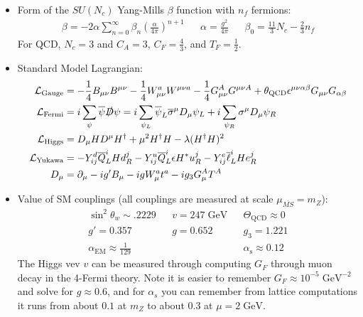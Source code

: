 \documentclass[11pt, oneside]{article}   	%
\theoremstyle{definition}
\numberwithin{equation}{subsection}		%
\begin{document}
\begin{itemize}
	\item Form of the $SU(N_c)$ Yang-Mills $\beta$ function with $n_f$ fermions:
	\begin{align}
		\beta = -2\alpha \sum_{n = 0}^\infty \beta_n \left(\frac{\alpha}{4\pi}\right)^{n + 1} && \alpha = \frac{g^2}{4\pi} &&
		\beta_0 = \frac{11}{3} N_c - \frac{2}{3} n_f 
	\end{align}
	For QCD, $N_c = 3$ and $C_A = 3$, $C_F = \frac{4}{3}$, and $T_F = \frac{1}{2}$.
	
	\item Standard Model Lagrangian: 
	\begin{align}
	\mathcal{L}_\mathrm{Gauge} &= -\frac{1}{4} B_{\mu\nu} B^{\mu\nu} - \frac{1}{4} W_{\mu\nu}^a W^{\mu\nu a} - \frac{1}{4} 
	G_{\mu\nu}^A G^{\mu\nu A} + \theta_\mathrm{QCD} \epsilon^{\mu\nu\alpha\beta} G_{\mu\nu} G_{\alpha\beta} \\
	\mathcal{L}_\mathrm{Fermi} &= i\sum_\psi\overline\psi \slashed D \psi = i\sum_{\psi_L} \overline\psi_L 
	\overline\sigma^\mu D_\mu\psi_L + i\sum_{\psi_R} \sigma^\mu D_\mu \psi_R \\
	\mathcal{L}_\mathrm{Higgs} &= D_\mu H D^\mu H^\dagger + \mu^2 H^\dagger H - \lambda (H^\dagger H)^2 \\
	\mathcal{L}_\mathrm{Yukawa} &= - Y_{ij}^d \overline Q_L^i H d_R^j - Y_{ij}^u \overline Q_L^i\epsilon H^* u_R^j - 
	Y_{ij}^e \overline\ell_L^i H e_R^j \\
	D_\mu &= \partial_\mu - i g' B_\mu - ig W_\mu^a t^a - ig_3 G_\mu^A T^A
	\end{align}
	
	\item Value of SM couplings (all couplings are measured at scale $\mu_{\overline{MS}} = m_Z$):
	\begin{align}
		\sin^2\theta_w \sim .2229 && v = 247\;\mathrm{GeV} && \Theta_\mathrm{QCD}\approx 0 \\
		g' = 0.357 && g = 0.652 && g_3 = 1.221 \\
		\alpha_\mathrm{EM}\approx\frac{1}{129} &&  && \alpha_\mathrm{s} \approx 0.12
	\end{align}
	The Higgs vev $v$ can be measured through computing $G_F$ through muon decay in the 4-Fermi theory. Note it is easier to remember 
	$G_F\approx 10^{-5}\;\mathrm{GeV}^{-2}$ and solve for $g\approx 0.6$, and for $\alpha_s$ you can remember from lattice computations 
	it runs from about $0.1$ at $m_Z$ to about $0.3$ at $\mu = 2\;\mathrm{GeV}$. 
	

\end{itemize}
\end{document}
